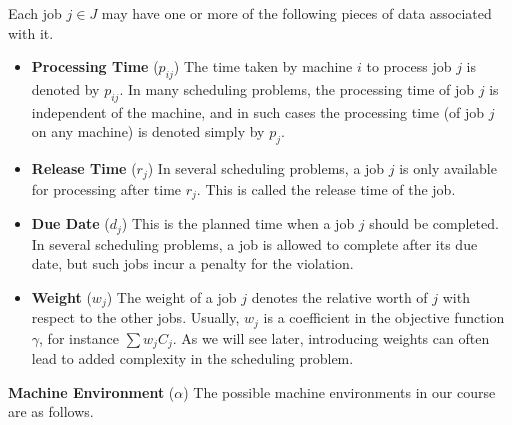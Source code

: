 Each job $j \in J$ may have one or more of the following pieces of data 
associated with it. 

\begin{itemize}

    \item {\bf Processing Time} ($p_{ij}$) The time taken by machine $i$ 
    to process job $j$ is denoted by $p_{ij}$. In many scheduling problems, 
    the processing time of job $j$ is independent of the machine, and in 
    such cases the processing time (of job $j$ on any machine) is denoted
    simply by $p_j$.

    \item {\bf Release Time} ($r_j$) In several scheduling problems, a job 
    $j$ is only available for processing after time $r_j$. This is called 
    the release time of the job.

    \item {\bf Due Date} ($d_j$) This is the planned time when a job $j$ 
    should be completed. In several scheduling problems, a job is allowed 
    to complete after its due date, but such jobs incur a penalty for the 
    violation.

    \item {\bf Weight} ($w_j$) The weight of a job $j$ denotes the relative 
    worth of $j$ with respect to the other jobs. Usually, $w_j$ is a 
    coefficient in the objective function $\gamma$, for instance 
    $\sum w_j C_j$. As we will see later, introducing weights can often lead 
    to added complexity in the scheduling problem.

\end{itemize}

{\bf Machine Environment} ($\alpha$) The possible machine environments 
in our course are as follows.

